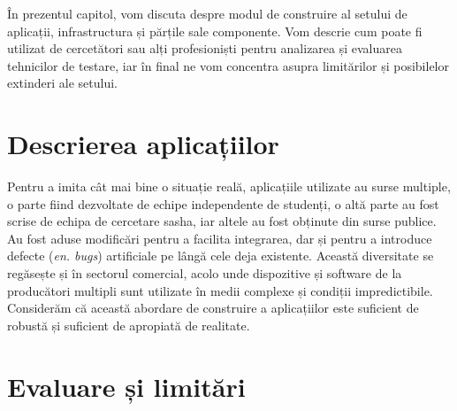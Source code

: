 În prezentul capitol, vom discuta despre modul de construire al setului de aplicații, infrastructura și părțile sale componente. Vom descrie cum poate fi utilizat de cercetători sau alți profesioniști pentru analizarea și evaluarea tehnicilor de testare, iar în final ne vom concentra asupra limitărilor și posibilelor extinderi ale setului.

\section{Descrierea aplicațiilor}

Pentru a imita cât mai bine o situație reală, aplicațiile utilizate au surse multiple, o parte fiind dezvoltate de echipe independente de studenți, o altă parte au fost scrise de echipa de cercetare \acrshort{sasha}, iar altele au fost obținute din surse publice. Au fost aduse modificări pentru a facilita integrarea, dar și pentru a introduce defecte (\textit{en. bugs}) artificiale pe lângă cele deja existente. Această diversitate se regăsește și în sectorul comercial, acolo unde dispozitive și software de la producători multipli sunt utilizate în medii complexe și condiții impredictibile. Considerăm că această abordare de construire a aplicațiilor este suficient de robustă și suficient de apropiată de realitate.

\section{Evaluare și limitări}